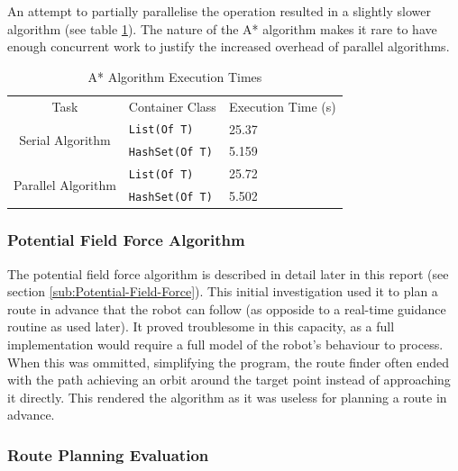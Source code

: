 \documentclass[10pt]{article}
\begin{document}
An attempt to partially parallelise the operation resulted in a slightly slower
algorithm (see table \ref{tab:aStarTimingsTable}). The nature of the A*
algorithm makes it rare to have enough concurrent work to justify the increased overhead
of parallel algorithms.

\begin{singlespace}
\begin{table}
\centering%
\begin{tabular}{|c|m{3cm}|p{2cm}|}
\hline
\multirow{2}{*}{Task} & \multirow{2}{3cm}{Container Class} &
\multirow{2}{2cm}{Execution Time (\si{\second})} \\
 &  & \\
\hline
\multirow{2}{*}{Serial Algorithm} & \texttt{List(Of T)} & \num{25.37}
\\
\cline{2-3}
 & \texttt{HashSet(Of T)} & \num{5.159} \\
\hline
\multirow{2}{*}{Parallel Algorithm} & \texttt{List(Of T)} & \num{25.72}
\\
\cline{2-3}
 & \texttt{HashSet(Of T)} & \num{5.502} \\
\hline
\end{tabular}

\caption{A* Algorithm Execution Times\label{tab:aStarTimingsTable}}
\end{table}

\end{singlespace}

\subsubsection{Potential Field Force Algorithm}

The potential field force algorithm is described in detail later in this report
(see section \ref{sub:Potential-Field-Force}).  This initial investigation used
it to plan a route in advance that the robot can follow (as opposide to a
real-time guidance routine as used later).  It proved troublesome in this
capacity, as a full implementation would require a full model of the robot's
behaviour to process.  When this was ommitted, simplifying the program, the
route finder often ended with the path achieving an orbit around the target
point instead of approaching it directly.  This rendered the algorithm as it was
useless for planning a route in advance.

\subsubsection{Route Planning Evaluation}
\end{document}
